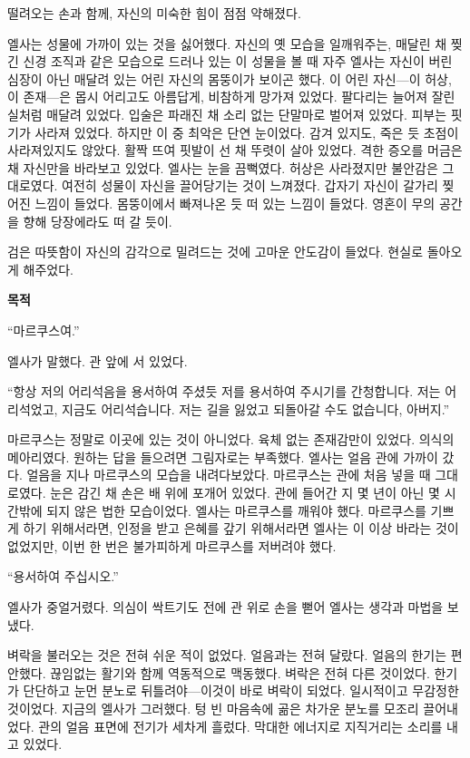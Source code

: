 떨려오는 손과 함께, 자신의 미숙한 힘이 점점 약해졌다.

엘사는 성물에 가까이 있는 것을 싫어했다. 자신의 옛 모습을 일깨워주는, 매달린 채 찢긴 신경 조직과 같은 모습으로 드러나 있는 이 성물을 볼 때 자주 엘사는 자신이 버린 심장이 아닌 매달려 있는 어린 자신의 몸뚱이가 보이곤 했다. 이 어린 자신—이 허상, 이 존재—은 몹시 어리고도 아름답게, 비참하게 망가져 있었다. 팔다리는 늘어져 잘린 실처럼 매달려 있었다. 입술은 파래진 채 소리 없는 단말마로 벌어져 있었다. 피부는 핏기가 사라져 있었다. 하지만 이 중 최악은 단연 눈이었다. 감겨 있지도, 죽은 듯 초점이 사라져있지도 않았다. 활짝 뜨여 핏발이 선 채 뚜렷이 살아 있었다. 격한 증오를 머금은 채 자신만을 바라보고 있었다. 엘사는 눈을 끔뻑였다. 허상은 사라졌지만 불안감은 그대로였다. 여전히 성물이 자신을 끌어당기는 것이 느껴졌다. 갑자기 자신이 갈가리 찢어진 느낌이 들었다. 몸뚱이에서 빠져나온 듯 떠 있는 느낌이 들었다. 영혼이 무의 공간을 향해 당장에라도 떠 갈 듯이.

검은 따뜻함이 자신의 감각으로 밀려드는 것에 고마운 안도감이 들었다. 현실로 돌아오게 해주었다.

\textbf{목적}

``마르쿠스여.''

엘사가 말했다. 관 앞에 서 있었다.

``항상 저의 어리석음을 용서하여 주셨듯 저를 용서하여 주시기를 간청합니다. 저는 어리석었고, 지금도 어리석습니다. 저는 길을 잃었고 되돌아갈 수도 없습니다, 아버지.''

마르쿠스는 정말로 이곳에 있는 것이 아니었다. 육체 없는 존재감만이 있었다. 의식의 메아리였다. 원하는 답을 들으려면 그림자로는 부족했다. 엘사는 얼음 관에 가까이 갔다. 얼음을 지나 마르쿠스의 모습을 내려다보았다. 마르쿠스는 관에 처음 넣을 때 그대로였다. 눈은 감긴 채 손은 배 위에 포개어 있었다. 관에 들어간 지 몇 년이 아닌 몇 시간밖에 되지 않은 법한 모습이었다. 엘사는 마르쿠스를 깨워야 했다. 마르쿠스를 기쁘게 하기 위해서라면, 인정을 받고 은혜를 갚기 위해서라면 엘사는 이 이상 바라는 것이 없었지만, 이번 한 번은 불가피하게 마르쿠스를 저버려야 했다.

``용서하여 주십시오.''

엘사가 중얼거렸다. 의심이 싹트기도 전에 관 위로 손을 뻗어 엘사는 생각과 마법을 보냈다.

벼락을 불러오는 것은 전혀 쉬운 적이 없었다. 얼음과는 전혀 달랐다. 얼음의 한기는 편안했다. 끊임없는 활기와 함께 역동적으로 맥동했다. 벼락은 전혀 다른 것이었다. 한기가 단단하고 눈먼 분노로 뒤틀려야—이것이 바로 벼락이 되었다. 일시적이고 무감정한 것이었다. 지금의 엘사가 그러했다. 텅 빈 마음속에 곪은 차가운 분노를 모조리 끌어내었다. 관의 얼음 표면에 전기가 세차게 흘렀다. 막대한 에너지로 지직거리는 소리를 내고 있었다.

